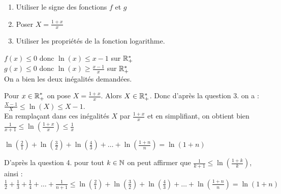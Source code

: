 \documentclass[oneside,12pt]{book}          %
\begin{document}
\begin{hint}
	\begin{enumerate}
		\item[3.] Utiliser le signe des fonctions $f$ et $g$
		\item[4.] Poser $X=\frac{1+x}{x}$
		\item[5.] Utiliser les propriétés de la fonction logarithme.
	\end{enumerate}
\end{hint}
\begin{sol}
	\begin{enumerate}
	\begin{minipage}{0.45\linewidth}
	\item {}
	\end{minipage}\hfill
	\begin{minipage}{0.45\linewidth}
	\item {}
	\end{minipage}
	\item $f(x)\leq0$ donc $\ln(x)\leq x-1$ sur ${\mathbb R}^*_+$\\
	$g(x)\leq0$ donc $\ln(x)\geq \frac{x-1}{x}$ sur ${\mathbb R}^*_+$\\
	On a bien les deux inégalités demandées.
	\item Pour ${x\in\mathbb R}^*_+$ on pose $X=\frac{1+x}{x}$. Alors $X\in{\mathbb R}^*_+$. Donc d'après la question 3. on a :\\
	$\frac{X-1}{X}\leq\ln(X)\leq X-1$.\\
	En remplaçant dans ces inégalités $X$ par $\frac{1+x}{x}$ et en simplifiant, on obtient bien $\frac{1}{x+1}\leq\ln\left(\frac{1+x}{x}\right)\leq\frac{1}{x}$
	\item $\ln\left(\frac{2}{1}\right)+\ln\left(\frac{3}{2}\right)+\ln\left(\frac{4}{3}\right)+\ldots+\ln\left(\frac{1+n}{n}\right) = \ln(1+n)$
	\item D'après la question 4. pour tout $k\in{\mathbb N}$ on peut affirmer que $\frac{1}{k+1}\leq\ln\left(\frac{1+k}{k}\right)$, ainsi :\\
	$\frac{1}{2}+\frac{1}{3}+\frac{1}{4}+\ldots+\frac{1}{n+1}\leq\ln\left(\frac{2}{1}\right)+\ln\left(\frac{3}{2}\right)+\ln\left(\frac{4}{3}\right)+\ldots+\ln\left(\frac{1+n}{n}\right)=\ln(1+n)$
	\end{enumerate}
\end{sol}
\end{document}
